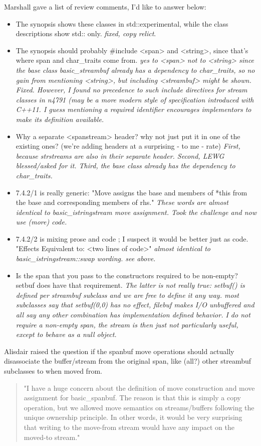 \documentclass[ebook,11pt,article]{memoir}
\begin{document}
Marshall gave a list of review comments, I'd like to answer below:
\begin{itemize}

\item  
The synopsis shows these classes in std::experimental, while the class descriptions show std:: only.
\textit{fixed, copy relict}.
\item  
The synopsis should probably \#include <span> and <string>, since that's where span and char_traits come from.
\textit{yes to <span> not to <string> since the base class basic_streambuf already has a dependency to char_traits, so no gain from mentioning <string>, but including <streambuf> might be shown. Fixed. However, I found no precedence to such include directives for stream classes in n4791 (may be a more modern style of specification introduced with C++11. I guess mentioning a required identifier encourages implementors to make its definition available. }
\item 
Why a separate <spanstream> header? why not just put it in one of the existing ones? 
       (we're adding headers at a surprising - to me - rate)
\textit{First, because strstreams are also in their separate header. Second, LEWG blessed/asked for it.
Third, the base class already has the dependency to char_traits.}
\item  7.4.2/1 is really generic: "Move assigns the base and members of *this from the base and corresponding members of rhs."
\textit{These words are almost identical to basic_istringstream move assignment. Took the challenge and now use (more) code.}
\item  7.4.2/2 is mixing prose and code ; I suspect it would be better just as code. "Effects Equivalent to: <two lines of code>"
\textit{almost identical to basic_istringstream::swap wording. see above.}
\item  Is the span that you pass to the constructors required to be non-empty?  setbuf does have that requirement.
\textit{The latter is not really true: setbuf() is defined per streambuf subclass and we are free to define it any way. most subclasses say that setbuf(0,0) has no effect, filebuf makes I/O unbuffered and all say any other combination has implementation defined behavior. I do not require a non-empty span, the stream is then just not particularly useful, except to behave as a null object.}
\end{itemize}

Alisdair raised the question if the spanbuf move operations should actually disassociate the buffer/stream from the original span, like (all?) other streambuf subclasses to when moved from. 
\begin{quote}
{"I have a huge concern about the definition of move construction and move assignment
for basic_spanbuf.  The reason is that this is simply a copy operation, but we allowed
move semantics on streams/buffers following the unique ownership principle.  In other
words, it would be very surprising that writing to the move-from stream would have any
impact on the moved-to stream."}
\end{quote}
\end{document}
